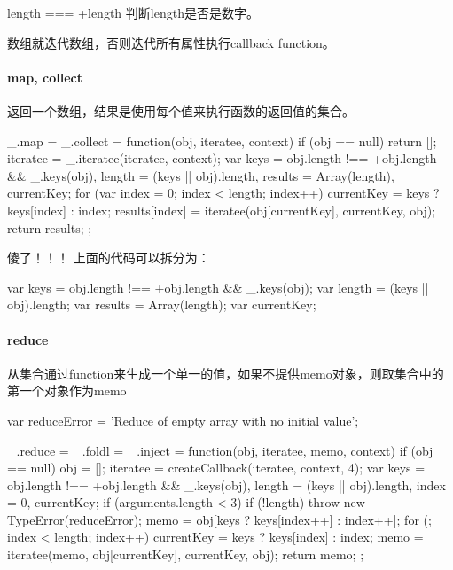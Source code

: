 length === +length 判断length是否是数字。

数组就迭代数组，否则迭代所有属性执行callback function。

\paragraph{map, collect}返回一个数组，结果是使用每个值来执行函数的返回值的集合。
\begin{JavaScript}
  _.map = _.collect = function(obj, iteratee, context) {
    if (obj == null) return [];
    iteratee = _.iteratee(iteratee, context);
    var keys = obj.length !== +obj.length && _.keys(obj),
        length = (keys || obj).length,
        results = Array(length),
        currentKey;
    for (var index = 0; index < length; index++) {
      currentKey = keys ? keys[index] : index;
      results[index] = iteratee(obj[currentKey], currentKey, obj);
    }
    return results;
  };
\end{JavaScript}	

傻了！！！ 上面的代码可以拆分为：

\begin{JavaScript}
  var keys = obj.length !== +obj.length && _.keys(obj); 
  var length = (keys || obj).length;
  var results = Array(length);
  var currentKey;
\end{JavaScript}

\paragraph{reduce} 从集合通过function来生成一个单一的值，如果不提供memo对象，则取集合中的第一个对象作为memo

\begin{JavaScript}
  var reduceError = 'Reduce of empty array with no initial value';
  
  _.reduce = _.foldl = _.inject = function(obj, iteratee, memo, context) {
    if (obj == null) obj = [];
    iteratee = createCallback(iteratee, context, 4);
    var keys = obj.length !== +obj.length && _.keys(obj),
        length = (keys || obj).length,
        index = 0, currentKey;
    if (arguments.length < 3) {
      if (!length) throw new TypeError(reduceError);
      memo = obj[keys ? keys[index++] : index++];
    }
    for (; index < length; index++) {
      currentKey = keys ? keys[index] : index;
      memo = iteratee(memo, obj[currentKey], currentKey, obj);
    }
    return memo;
  };
\end{JavaScript}

